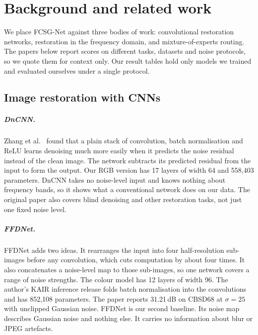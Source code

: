 \documentclass[12pt,a4paper,oneside]{NITR}
\newcommand{\fcsg}{FCSG-Net}
\newcommand{\dB}{\,dB}
\begin{document}
\chapter{Background and related work}\label{ch:literature}

We place \fcsg{} against three bodies of work: convolutional restoration
networks, restoration in the frequency domain, and mixture-of-experts
routing. The papers below report scores on different tasks, datasets and
noise protocols, so we quote them for context only. Our result tables hold
only models we trained and evaluated ourselves under a single protocol.

\section{Image restoration with CNNs}\label{sec:lit-cnn}

\paragraph{DnCNN.} Zhang et al.\ \cite{zhang2017dncnn} found that a plain
stack of convolution, batch normalisation and ReLU learns denoising much more
easily when it predicts the noise residual instead of the clean image. The
network subtracts its predicted residual from the input to form the output.
Our RGB version has 17 layers of width 64 and 558,403 parameters. DnCNN takes
no noise-level input and knows nothing about frequency bands, so it shows
what a conventional network does on our data. The original paper also
covers blind denoising and other restoration tasks, not just one fixed noise
level.

\paragraph{FFDNet.} FFDNet \cite{zhang2018ffdnet} adds two ideas. It
rearranges the input into four half-resolution sub-images before any
convolution, which cuts computation by about four times. It also
concatenates a noise-level map to those sub-images, so one network covers a
range of noise strengths. The colour model has 12 layers of width 96. The
author's KAIR inference release \cite{kair} folds batch normalisation into the
convolutions and has 852,108 parameters. The paper reports 31.21\dB{} on
CBSD68 at $\sigma=25$ with unclipped Gaussian noise. FFDNet is our second
baseline. Its noise map describes Gaussian noise and nothing else. It carries
no information about blur or JPEG artefacts.
\end{document}
